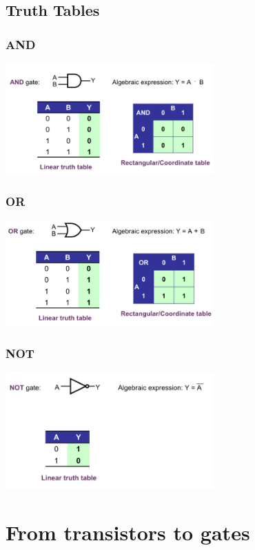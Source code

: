 \documentclass{article}[18pt]
\begin{document}
\subsection{Truth Tables}
\subsubsection{AND}
\includegraphics[width=8cm]{AND.png}
\subsubsection{OR}
\includegraphics[width=8cm]{OR.png}
\subsubsection{NOT}
\includegraphics[width=8cm]{NOT.png}
\section{From transistors to gates}
\end{document}
